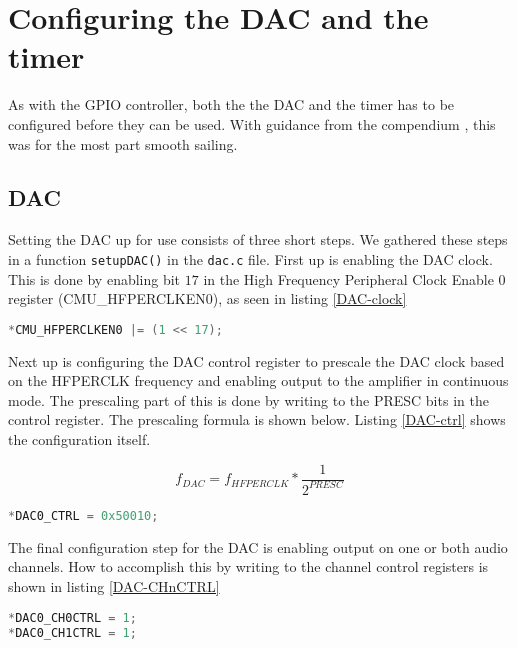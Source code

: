 \section{Configuring the DAC and the timer}

As with the GPIO controller, both the the DAC and the timer has to be configured before they can be used. With guidance from the compendium \cite{compendium}, this was for the most part smooth sailing.

\subsection{DAC}

Setting the DAC up for use consists of three short steps. We gathered these steps in a function \texttt{setupDAC()} in the \texttt{dac.c} file. First up is enabling the DAC clock. This is done by enabling bit $17$ in the High Frequency Peripheral Clock Enable 0 register (CMU\_HFPERCLKEN0), as seen in listing \ref{DAC-clock}

\begin{minipage}{\linewidth}
\begin{lstlisting}[language=C, label=DAC-clock, caption=Enabling DAC clock]
*CMU_HFPERCLKEN0 |= (1 << 17);
\end{lstlisting}
\end{minipage}

Next up is configuring the DAC control register to prescale the DAC clock based on the HFPERCLK frequency and enabling output to the amplifier in continuous mode. The prescaling part of this is done by writing to the PRESC bits in the control register. The prescaling formula is shown below. Listing \ref{DAC-ctrl} shows the configuration itself.

\[f_{DAC} = f_{HFPERCLK} * \frac{1}{2^{PRESC}}\]

\begin{lstlisting}[language=C, label=DAC-ctrl, caption=Configuring]
*DAC0_CTRL = 0x50010;
\end{lstlisting}

The final configuration step for the DAC is enabling output on one or both audio channels. How to accomplish this by writing to the channel control registers is shown in listing \ref{DAC-CHnCTRL}

\begin{lstlisting}[language=C, label=DAC-CHnCTRL, caption=Enabling output to both audio channels]
*DAC0_CH0CTRL = 1;
*DAC0_CH1CTRL = 1;
\end{lstlisting}

